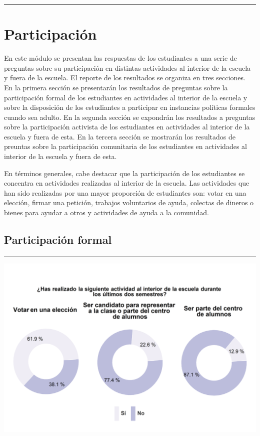 \documentclass[
  14pt,
]{book}
\let\origfigure\figure
\let\endorigfigure\endfigure
\renewenvironment{figure}[1][2] {
  \expandafter\origfigure\expandafter[H]
} {
  \endorigfigure
}
\begin{document}
\begin{center}\rule{0.5\linewidth}{0.5pt}\end{center}

\hypertarget{participaciuxf3n}{%
\chapter{Participación}\label{participaciuxf3n}}

En este módulo se presentan las respuestas de los estudiantes a una serie de preguntas sobre su participación en distintas actividades al interior de la escuela y fuera de la escuela. El reporte de los resultados se organiza en tres secciones. En la primera sección se presentarán los resultados de preguntas sobre la participación formal de los estudiantes en actividades al interior de la escuela y sobre la disposición de los estudiantes a participar en instancias políticas formales cuando sea adulto. En la segunda sección se expondrán los resultados a preguntas sobre la participación activista de los estudiantes en actividades al interior de la escuela y fuera de esta. En la tercera sección se mostrarán los resultados de preuntas sobre la participación comunitaria de los estudiantes en actividades al interior de la escuela y fuera de esta.

En términos generales, cabe destacar que la participación de los estudiantes se concentra en actividades realizadas al interior de la escuela. Las actividades que han sido realizadas por una mayor proporción de estudiantes son: votar en una elección, firmar una petición, trabajos voluntarios de ayuda, colectas de dineros o bienes para ayudar a otros y actividades de ayuda a la comunidad.

\hypertarget{participaciuxf3n-formal}{%
\section{Participación formal}\label{participaciuxf3n-formal}}

\begin{center}\rule{0.5\linewidth}{0.5pt}\end{center}

\begin{figure}[!ht]

{\centering \includegraphics[width=0.8\linewidth,]{images/graph_partform_act} 

}

\caption{Participación formal al interior de la escuela}\label{fig:unnamed-chunk-52}
\end{figure}
\end{document}
